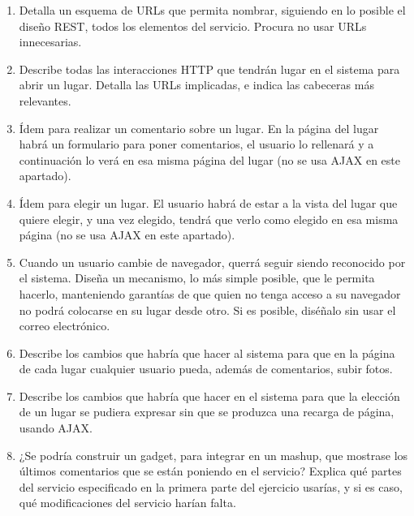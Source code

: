 \begin{enumerate}
\item Detalla un esquema de URLs que permita nombrar, siguiendo en lo posible el diseño REST, todos los elementos del servicio. Procura no usar URLs innecesarias.

\item Describe todas las interacciones HTTP que tendrán lugar en el sistema
  para abrir un lugar. Detalla las URLs implicadas, e indica las cabeceras más
  relevantes.

\item Ídem para realizar un comentario sobre un  lugar. En la página del lugar habrá un  formulario para poner comentarios, el usuario lo rellenará y a continuación lo verá en esa misma página del lugar (no se usa AJAX en este apartado).

\item Ídem para elegir un  lugar. El usuario habrá de estar a la vista del lugar que quiere elegir, y una vez elegido, tendrá que verlo como elegido en esa misma página (no se usa AJAX en este apartado).

\item Cuando un usuario cambie de navegador, querrá seguir siendo reconocido por el sistema. Diseña un mecanismo, lo más simple posible, que le permita hacerlo, manteniendo garantías de que quien no tenga acceso a su navegador no podrá colocarse en su lugar desde otro. Si es posible, diséñalo sin usar el correo electrónico.

\item Describe los cambios que habría que hacer al sistema para que en la página de cada lugar cualquier usuario pueda, además de comentarios, subir fotos.

\item Describe los cambios que habría que hacer en el sistema para que la elección de un lugar se pudiera expresar sin que se produzca una recarga de página, usando AJAX.

\item ¿Se podría construir un gadget, para integrar en un mashup, que mostrase los últimos comentarios que se están poniendo en el servicio? Explica qué partes del servicio especificado en la primera parte del ejercicio usarías, y si es caso, qué modificaciones del servicio harían falta.
\end{enumerate}

